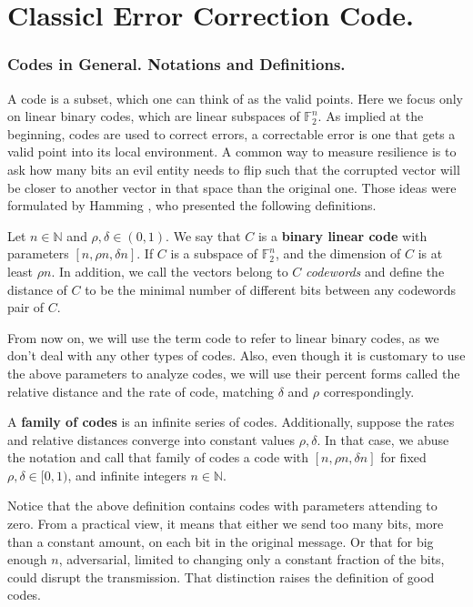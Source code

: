 \documentclass[12pt,a4paper]{article}
\begin{document}
\newcommand{\cH}{\mathcal{H}}
\newcommand{\ketbra}[1]{\ket{#1}\bra{#1}}
\newcommand{\brakett}[3]{\braket{#1 | #2 | #3}}
\newcommand{\old}[1]{}
\newcommand{\tT}{\tilde{T}}
\newcommand{\trace}{ \mathbf{Tr} }




\part{Classicl Error Correction Code.}

  \section{Codes in General. Notations and Definitions.}
  
A code is a subset, which one can think of as the valid points. Here we focus only on linear binary codes, which are linear subspaces of $\mathbb{F}_{2}^{n}$. As implied at the beginning, codes are used to correct errors, a correctable error is one that gets a valid point into its local environment. A common way to measure resilience is to ask how many bits an evil entity needs to flip such that the corrupted vector will be closer to another vector in that space than the original one. Those ideas were formulated by Hamming \cite{Hamming}, who presented the following definitions. 
  \begin{definition} \label{bi-code} Let $n \in \mathbb{N}$ and $\rho, \delta\in \left( 0,1 \right)$. We say that $C$ is a \textbf{binary linear code} with parameters $[n, \rho n, \delta n]$. If $C$ is a subspace of $\mathbb{F}_{2}^{n}$, and the dimension of $C$ is at least $\rho n$. In addition, we call the vectors belong to $C$ \textit{codewords} and define the distance of $C$ to be the minimal number of different bits between any codewords pair of $C$.   
  \end{definition}
  From now on, we will use the term code to refer to linear binary codes, as we don't deal with any other types of codes. Also, even though it is customary to use the above parameters to analyze codes, we will use their percent forms called the relative distance and the rate of code, matching $\delta$ and $\rho$ correspondingly.     
  \begin{definition} \label{family} A \textbf{family of codes} is an infinite series of codes. Additionally, suppose the rates and relative distances converge into constant values $\rho,\delta$. In that case, we abuse the notation and call that family of codes a code with $[n, \rho n, \delta n]$ for fixed $\rho, \delta\in [ 0,1 )$, and infinite integers $n \in \mathbb{N}$.     
  \end{definition}
  Notice that the above definition contains codes with parameters attending to zero. From a practical view, it means that either we send too many bits, more than a constant amount, on each bit in the original message. Or that for big enough $n$, adversarial, limited to changing only a constant fraction of the bits, could disrupt the transmission. That distinction raises the definition of good codes.
\end{document}
